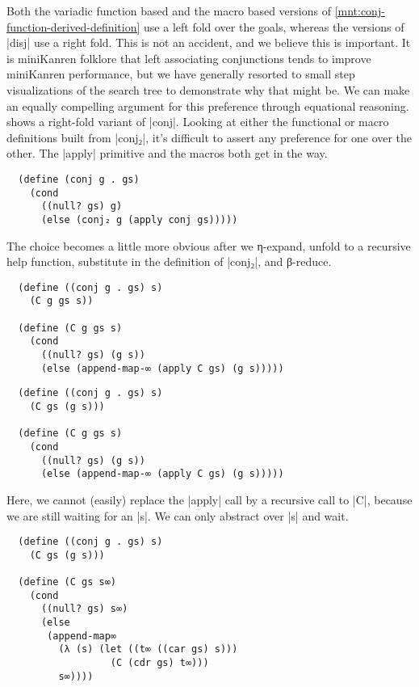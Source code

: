 \documentclass[sigplan,screen,draft,anonymous,review,natbib=false]{acmart}
\begin{document}
Both the variadic function based and the macro based versions of
\cref{mnt:conj-function-derived-definition} use a left fold over the
goals, whereas the versions of \rackinline|disj| use a right fold.
This is not an accident, and we believe this is important. It is
miniKanren folklore that left associating conjunctions tends to improve
miniKanren performance, but we have generally resorted to small step
visualizations of the search tree to demonstrate why that might be. We
can make an equally compelling argument for this preference through
equational reasoning.  shows a
right-fold variant of \rackinline|conj|. Looking at either the
functional or macro definitions built from \rackinline|conj₂|, it's
difficult to assert any preference for one over the other. The
\rackinline|apply| primitive and the macros both get in the way.

\begin{listing}
\begin{verbatim}
  (define (conj g . gs)
    (cond
      ((null? gs) g)
      (else (conj₂ g (apply conj gs)))))
\end{verbatim}
  \caption{A right-fold variant of \rackinline|conj|.}
  \label{mnt:conj-right-fold-definition}
\end{listing}

The choice becomes a little more obvious after we η-expand, unfold to
a recursive help function, substitute in the definition of
\rackinline|conj₂|, and β-reduce.

\begin{verbatim}
  (define ((conj g . gs) s)
    (C g gs s))

  (define (C g gs s)
    (cond
      ((null? gs) (g s))
      (else (append-map-∞ (apply C gs) (g s)))))
\end{verbatim}


\begin{verbatim}
  (define ((conj g . gs) s)
    (C gs (g s)))

  (define (C g gs s)
    (cond
      ((null? gs) (g s))
      (else (append-map-∞ (apply C gs) (g s)))))
\end{verbatim}


Here, we cannot (easily) replace the \rackinline|apply| call by a
recursive call to \rackinline|C|, because we are still waiting for an
\rackinline|s|. We can only abstract over \rackinline|s| and wait.

\begin{verbatim}
  (define ((conj g . gs) s)
    (C gs (g s)))

  (define (C gs s∞)
    (cond
      ((null? gs) s∞)
      (else
       (append-map∞
         (λ (s) (let ((t∞ ((car gs) s)))
                  (C (cdr gs) t∞)))
         s∞))))
\end{verbatim}
\end{document}
